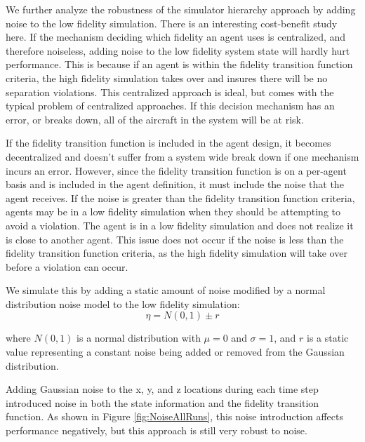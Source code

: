 \documentclass{aamas2014}
\begin{document}
We further analyze the robustness of the simulator hierarchy approach by adding noise to the low fidelity simulation. There is an interesting cost-benefit study here. If the mechanism deciding which fidelity an agent uses is centralized, and therefore noiseless, adding noise to the low fidelity system state will hardly hurt performance. This is because if an agent is within the fidelity transition function criteria, the high fidelity simulation takes over and insures there will be no separation violations. This centralized approach is ideal, but comes with the typical problem of centralized approaches. If this decision mechanism has an error, or breaks down, all of the aircraft in the system will be at risk. 

If the fidelity transition function is included in the agent design, it becomes decentralized and doesn't suffer from a system wide break down if one mechanism incurs an error. However, since the fidelity transition function is on a per-agent basis and is included in the agent definition, it must include the noise that the agent receives. If the noise is greater than the fidelity transition function criteria, agents may be in a low fidelity simulation when they should be attempting to avoid a violation. The agent is in a low fidelity simulation and does not realize it is close to another agent. This issue does not occur if the noise is less than the fidelity transition function criteria, as the high fidelity simulation will take over before a violation can occur.

We simulate this by adding a static amount of noise modified by a normal distribution noise model to the low fidelity simulation:
%
\begin{equation}
\eta = N(0,1) \pm r
\end{equation} 

where $N(0,1)$ is a normal distribution with $\mu = 0$ and $\sigma = 1$, and $r$ is a static value representing a constant noise being added or removed from the Gaussian distribution.

Adding Gaussian noise to the x, y, and z locations during each time step introduced noise in both the state information and the fidelity transition function. As shown in Figure \ref{fig:NoiseAllRuns}, this noise introduction affects performance negatively, but this approach is still very robust to noise.
\end{document}
